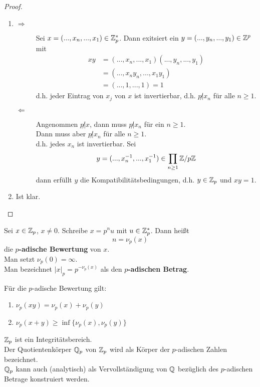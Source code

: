 	\begin{proof}
		\begin{enumerate}
			\item \begin{description}
				\item[$\Rightarrow$] Sei $x=(...,x_n,...,x_1)\in\mathbb{Z}_p^*$. Dann exitsiert ein $y=(...,y_n,...,y_1)\in\mathbb{Z}^p$ mit
				\begin{align*}
				xy&=(...,x_n,...,x_1)(...,y_n,...,y_1)\\
				&=(...,x_ny_n,...,x_1y_1)\\
				&=(...,1,...,1)=1
				\end{align*}
				d.h. jeder Eintrag von $x_j$ von $x$ ist invertierbar, d.h. $p\not| x_n$ für alle $n\geq 1$.
				\item[$\Leftarrow$] Angenommen $p\not| x$, dann muss $p\not| x_n$ für ein $n\geq 1$.\\
				Dann muss aber $p\not|x_n$ für alle $n\geq 1$.\\
				d.h. jedes $x_n$ ist invertierbar. Sei
				\[y=(...,x_n^{-1},...,x_1^{-1})\in\prod_{n\geq 1}\mathbb{Z}/p\mathbb{Z}\]
				dann erfüllt $y$ die Kompatibilitätsbedingungen, d.h. $y\in\mathbb{Z}_p$ und $xy=1$.
			\end{description}
			\item Ist klar.
		\end{enumerate}
	\end{proof}

	\begin{definition}
		Sei $x\in\mathbb{Z}_p$, $x\neq 0$. Schreibe $x=p^nu$ mit $u\in \mathbb{Z}_p^*$. Dann heißt\\
		\[n=\nu_p(x)\]
		die \textbf{$p$-adische Bewertung} von $x$.\\
		Man setzt $\nu_p(0)=\infty$.\\
		Man bezeichnet $|x|_p=p^{-\nu_p(x)}$ als den \textbf{$p$-adischen Betrag}.
	\end{definition}

	\begin{lem}
		Für die $p$-adische Bewertung gilt:
		\begin{enumerate}
			\item $\nu_p(xy)=\nu_p(x)+\nu_p(y)$
			\item $\nu_p(x+y)\geq\inf\big\{\nu_p(x),\nu_p(y)\big\}$
		\end{enumerate}
	\end{lem}

	\begin{satz}
		$\mathbb{Z}_p$ ist ein Integritätsbereich.\\
		Der Quotientenkörper $\mathbb{Q}_p$ von $\mathbb{Z}_p$ wird als Körper der $p$-adischen Zahlen bezeichnet.\\
		$\mathbb{Q}_p$ kann auch (analytisch) als Vervollständigung von $\mathbb{Q}$ bezüglich des $p$-adischen Betrage konstruiert werden.
	\end{satz}

